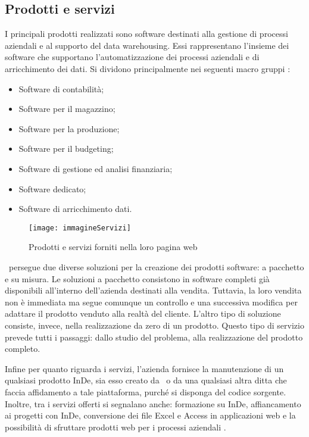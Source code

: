 \subsection{Prodotti e servizi}
\label{cap1:Prodotti e servizi}
I principali prodotti realizzati sono software destinati alla gestione di processi aziendali e al supporto del data warehousing. Essi rappresentano l'insieme dei software che supportano l'automatizzazione dei processi aziendali e di arricchimento dei dati. Si dividono principalmente nei seguenti macro gruppi \hyperref[bib2]{\cite{[2]}}:
\begin{itemize}
	\item Software di contabilità;
	\item Software per il magazzino;
	\item Software per la produzione;
	\item Software per il budgeting;
	\item Software di gestione ed analisi finanziaria;
	\item Software dedicato;
	\item Software di arricchimento dati.
\end{itemize}

\begin{figure}[!h] 
	\centering 
	\texttt{[image: immagineServizi]} 
	\caption{Prodotti e servizi forniti nella loro pagina web}
\end{figure}

\azienda\ persegue due diverse soluzioni per la creazione dei prodotti software: a pacchetto e su misura. Le soluzioni a pacchetto consistono in software completi già disponibili all'interno dell'azienda destinati alla vendita. Tuttavia, la loro vendita non è immediata ma segue comunque un controllo e una successiva modifica per adattare il prodotto venduto alla realtà del cliente. L'altro tipo di soluzione consiste, invece, nella realizzazione da zero di un prodotto. Questo tipo di servizio prevede tutti i passaggi: dallo studio del problema, alla realizzazione del prodotto completo.

Infine per quanto riguarda i servizi, l'azienda fornisce la manutenzione di un qualsiasi prodotto InDe, sia esso creato da \azienda\ o da una qualsiasi altra ditta che faccia affidamento a tale piattaforma, purché si disponga del codice sorgente. Inoltre, tra i servizi offerti si segnalano anche: formazione su InDe, affiancamento ai progetti con InDe, conversione dei file Excel e Access in applicazioni web e la possibilità di sfruttare prodotti web per i processi aziendali \hyperref[bib1]{\cite{[1]}}.


